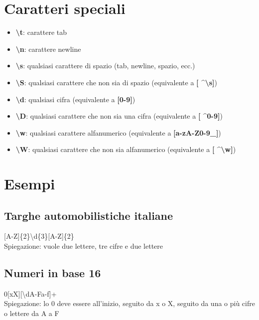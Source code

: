 \documentclass[10pt]{article}
\begin{document}
\section{Caratteri speciali}
\begin{itemize}
    \item \textbf{\textbackslash t}: carattere tab
    \item \textbf{\textbackslash n}: carattere newline
    \item \textbf{\textbackslash s}: qualsiasi carattere di spazio (tab, newline, spazio, ecc.)
    \item \textbf{\textbackslash S}: qualsiasi carattere che non sia di spazio (equivalente a \textbf{[ \textasciicircum\textbackslash s]})
    \item \textbf{\textbackslash d}: qualsiasi cifra (equivalente a \textbf{[0-9]})
    \item \textbf{\textbackslash D}: qualsiasi carattere che non sia una cifra (equivalente a \textbf{[ \textasciicircum0-9]})
    \item \textbf{\textbackslash w}: qualsiasi carattere alfanumerico (equivalente a \textbf{[a-zA-Z0-9\_]})
    \item \textbf{\textbackslash W}: qualsiasi carattere che non sia alfanumerico (equivalente a \textbf{[ \textasciicircum \textbackslash w]})
\end{itemize}
\section{Esempi}
\subsection{Targhe automobilistiche italiane}
[A-Z]\{2\}\textbackslash d\{3\}[A-Z]\{2\}\\
Spiegazione: vuole due lettere, tre cifre e due lettere
\subsection{Numeri in base 16}
0[xX][\textbackslash dA-Fa-f]+\\
Spiegazione: lo 0 deve essere all'inizio, seguito da x o X, seguito da una o più cifre o lettere da A a F
\end{document}
